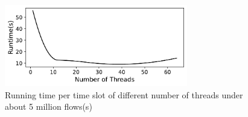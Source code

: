 \begin{figure}
	\centering
	\includegraphics[width = 8cm]{figs/evaluation/runtimeComp.pdf}
	\caption{\small Running time per time slot of different number of threads under about 5 million flows(s)}
	\label{fig:runtimeComp}
\end{figure}









